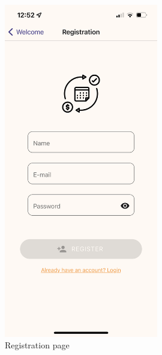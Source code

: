 \documentclass[11pt]{article}
\begin{document}
\begin{figure}[h!]
\begin{minipage}[c]{0.45\textwidth}
        \includegraphics[width=0.6\textwidth, clip]{../../assets/smartphone/reg.PNG}
        \caption{Registration page}
        \label{fig:reg}
    \end{minipage}
\end{figure}
\end{document}
